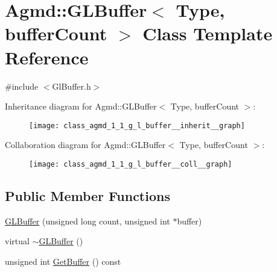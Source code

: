 \hypertarget{class_agmd_1_1_g_l_buffer}{\section{Agmd\+:\+:G\+L\+Buffer$<$ Type, buffer\+Count $>$ Class Template Reference}
\label{class_agmd_1_1_g_l_buffer}
}


{\ttfamily \#include $<$Gl\+Buffer.\+h$>$}



Inheritance diagram for Agmd\+:\+:G\+L\+Buffer$<$ Type, buffer\+Count $>$\+:\nopagebreak
\begin{figure}[H]
\begin{center}
\leavevmode
\texttt{[image: class\_agmd\_1\_1\_g\_l\_buffer\_\_inherit\_\_graph]}
\end{center}
\end{figure}


Collaboration diagram for Agmd\+:\+:G\+L\+Buffer$<$ Type, buffer\+Count $>$\+:\nopagebreak
\begin{figure}[H]
\begin{center}
\leavevmode
\texttt{[image: class\_agmd\_1\_1\_g\_l\_buffer\_\_coll\_\_graph]}
\end{center}
\end{figure}
\subsection*{Public Member Functions}
\begin{DoxyCompactItemize}
\item 
\hyperlink{class_agmd_1_1_g_l_buffer_a063427438dd4eb157750c899c4aec4e4}{G\+L\+Buffer} (unsigned long count, unsigned int $\ast$buffer)
\item 
virtual \hyperlink{class_agmd_1_1_g_l_buffer_ab69eda0d07e2ea04ef8f02b2593e147e}{$\sim$\+G\+L\+Buffer} ()
\item 
unsigned int \hyperlink{class_agmd_1_1_g_l_buffer_a754408f7dcdccd0b8339a3bef54e7cc0}{Get\+Buffer} () const 
\end{DoxyCompactItemize}
